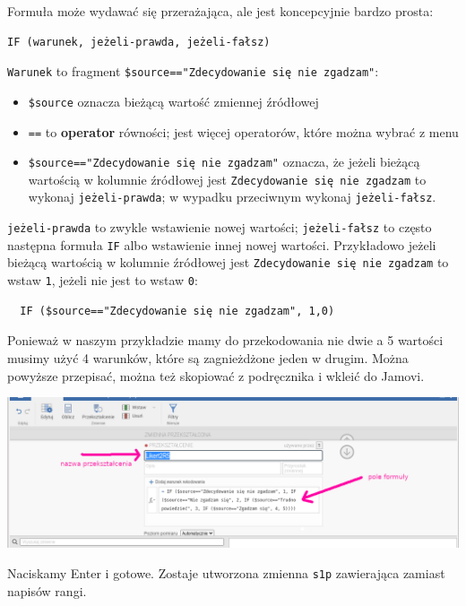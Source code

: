 \documentclass[
  openany]{book}
\begin{document}
Formuła może wydawać się przerażająca, ale jest koncepcyjnie bardzo prosta:

\begin{verbatim}
IF (warunek, jeżeli-prawda, jeżeli-fałsz)
\end{verbatim}

\texttt{Warunek} to fragment \texttt{\$source=="Zdecydowanie\ się\ nie\ zgadzam"}:

\begin{itemize}
\item
  \texttt{\$source} oznacza bieżącą wartość zmiennej źródłowej
\item
  \texttt{==} to \textbf{operator} równości; jest więcej operatorów, które można
  wybrać z menu
\item
  \texttt{\$source=="Zdecydowanie\ się\ nie\ zgadzam"} oznacza, że jeżeli
  bieżącą wartością w kolumnie źródłowej jest \texttt{Zdecydowanie\ się\ nie\ zgadzam}
  to wykonaj \texttt{jeżeli-prawda}; w wypadku przeciwnym wykonaj \texttt{jeżeli-fałsz}.
\end{itemize}

\texttt{jeżeli-prawda} to zwykle wstawienie nowej wartości;
\texttt{jeżeli-fałsz} to często następna formuła \texttt{IF} albo wstawienie innej
nowej wartości. Przykładowo jeżeli
bieżącą wartością w kolumnie źródłowej jest \texttt{Zdecydowanie\ się\ nie\ zgadzam}
to wstaw \texttt{1}, jeżeli nie jest to wstaw \texttt{0}:

\begin{verbatim}
  IF ($source=="Zdecydowanie się nie zgadzam", 1,0)
\end{verbatim}

Ponieważ w naszym przykładzie mamy do przekodowania nie dwie a 5 wartości
musimy użyć 4 warunków, które
są zagnieżdżone jeden w drugim. Można powyższe przepisać, można
też skopiować z podręcznika i wkleić do Jamovi.

\includegraphics{./przeksztalcenie_1p.png}

Naciskamy Enter i gotowe. Zostaje utworzona zmienna \texttt{s1p}
zawierająca zamiast napisów rangi.
\end{document}
